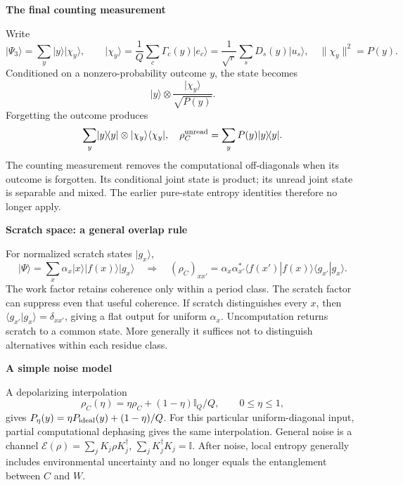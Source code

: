 \documentclass[11pt,a4paper]{article}
\newcommand{\ket}[1]{\lvert#1\rangle}
\newcommand{\bra}[1]{\langle#1\rvert}
\newcommand{\proj}[1]{\ket{#1}\!\bra{#1}}
\newcommand{\id}{\mathbb I}
\newcommand{\E}{\mathcal E}
\newcommand{\lead}[1]{\par\vspace{3pt}\textbf{\color{ink}#1}\par}
\begin{document}
\lead{The final counting measurement}
Write
\[
\ket{\Psi_3}=\sum_y\ket y\ket{\chi_y},
\qquad
\ket{\chi_y}=\frac1Q\sum_c\Gamma_c(y)\ket{e_c}
=\frac1{\sqrt r}\sum_sD_s(y)\ket{u_s},
\quad \|\chi_y\|^2=P(y).
\]
Conditioned on a nonzero-probability outcome \(y\), the state becomes
\[
\ket y\otimes\frac{\ket{\chi_y}}{\sqrt{P(y)}}.
\]
Forgetting the outcome produces
\[
\sum_y\proj y\otimes\ket{\chi_y}\bra{\chi_y},
\quad
\rho_C^{\rm unread}=\sum_yP(y)\proj y.
\]
The counting measurement removes the computational off-diagonals when its outcome is forgotten. Its conditional joint state is product; its unread joint state is separable and mixed. The earlier pure-state entropy identities therefore no longer apply.

\lead{Scratch space: a general overlap rule}
For normalized scratch states \(\ket{g_x}\),
\[
\ket\Psi=\sum_x\alpha_x\ket x\ket{f(x)}\ket{g_x}
\quad\Longrightarrow\quad
(\rho_C)_{xx'}=\alpha_x\alpha_{x'}^*
\langle f(x')|f(x)\rangle\langle g_{x'}|g_x\rangle.
\]
The work factor retains coherence only within a period class. The scratch factor can suppress even that useful coherence. If scratch distinguishes every \(x\), then \(\langle g_{x'}|g_x\rangle=\delta_{xx'}\), giving a flat output for uniform \(\alpha_x\).
Uncomputation returns scratch to a common state. More generally it suffices not to distinguish alternatives within each residue class.

\lead{A simple noise model}
A depolarizing interpolation
\[
\rho_C(\eta)=\eta\rho_C+(1-\eta)\id_Q/Q,\qquad 0\le\eta\le1,
\]
gives \(P_\eta(y)=\eta P_{\rm ideal}(y)+(1-\eta)/Q\). For this particular uniform-diagonal input, partial computational dephasing gives the same interpolation. General noise is a channel \(\E(\rho)=\sum_jK_j\rho K_j^\dagger\), \(\sum_jK_j^\dagger K_j=\id\). After noise, local entropy generally includes environmental uncertainty and no longer equals the entanglement between \(C\) and \(W\).


\end{document}
